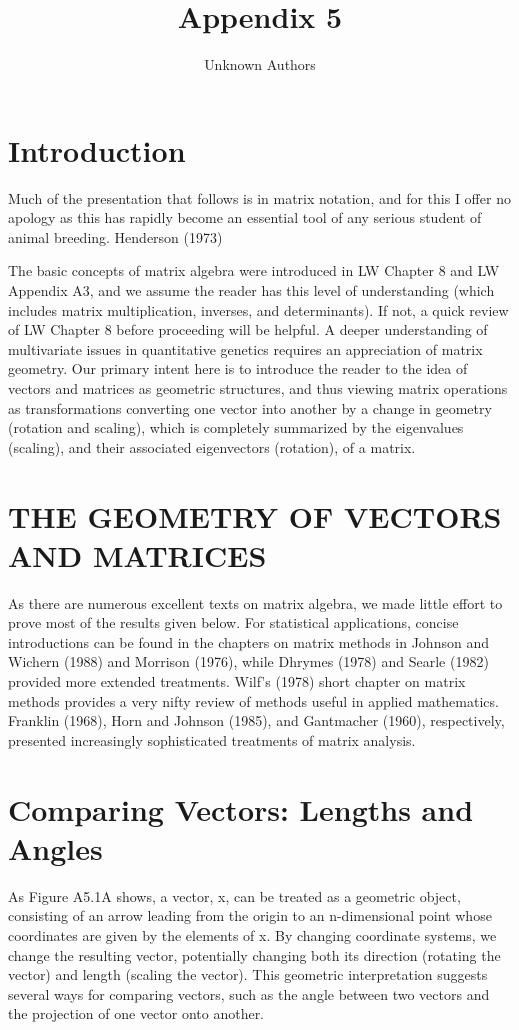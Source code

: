 \documentclass{article}
\title{Appendix 5}
\author{Unknown Authors}
\date{}
\begin{document}
\maketitle

\begin{abstract}

\end{abstract}

\section{Introduction}
Much of the presentation that follows is in matrix notation, and for this I offer no apology as this has rapidly become an essential tool of any serious student of animal breeding.
Henderson (1973)

The basic concepts of matrix algebra were introduced in LW Chapter 8 and LW Appendix A3, and we assume the reader has this level of understanding (which includes matrix multiplication, inverses, and determinants). If not, a quick review of LW Chapter 8 before proceeding will be helpful. A deeper understanding of multivariate issues in quantitative genetics requires an appreciation of matrix geometry. Our primary intent here is to introduce the reader to the idea of vectors and matrices as geometric structures, and thus viewing matrix operations as transformations converting one vector into another by a change in geometry (rotation and scaling), which is completely summarized by the eigenvalues (scaling), and their associated eigenvectors (rotation), of a matrix.

\section{THE GEOMETRY OF VECTORS AND MATRICES}
As there are numerous excellent texts on matrix algebra, we made little effort to prove most of the results given below. For statistical applications, concise introductions can be found in the chapters on matrix methods in Johnson and Wichern (1988) and Morrison (1976), while Dhrymes (1978) and Searle (1982) provided more extended treatments. Wilf's (1978) short chapter on matrix methods provides a very nifty review of methods useful in applied mathematics. Franklin (1968), Horn and Johnson (1985), and Gantmacher (1960), respectively, presented increasingly sophisticated treatments of matrix analysis.

\section{Comparing Vectors: Lengths and Angles}
As Figure A5.1A shows, a vector, x, can be treated as a geometric object, consisting of an arrow leading from the origin to an n-dimensional point whose coordinates are given by the elements of x. By changing coordinate systems, we change the resulting vector, potentially changing both its direction (rotating the vector) and length (scaling the vector). This geometric interpretation suggests several ways for comparing vectors, such as the angle between two vectors and the projection of one vector onto another.
\end{document}
